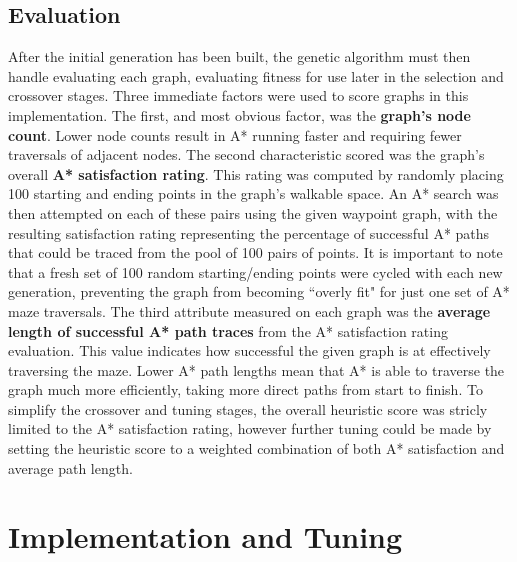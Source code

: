 	\subsection{Evaluation}
	After the initial generation has been built, the genetic algorithm must then handle evaluating each graph, evaluating fitness for use later in the selection and crossover stages. Three immediate factors were used to score graphs in this implementation. The first, and most obvious factor, was the \textbf{graph's node count}. Lower node counts result in A* running faster and requiring fewer traversals of adjacent nodes. The second characteristic scored was the graph's overall \textbf{A* satisfaction rating}. This rating was computed by randomly placing 100 starting and ending points in the graph's walkable space. An A* search was then attempted on each of these pairs using the given waypoint graph, with the resulting satisfaction rating representing the percentage of successful A* paths that could be traced from the pool of 100 pairs of points. It is important to note that a fresh set of 100 random starting/ending points were cycled with each new generation, preventing the graph from becoming ``overly fit" for just one set of A* maze traversals. The third attribute measured on each graph was the \textbf{average length of successful A* path traces} from the A* satisfaction rating evaluation. This value indicates how successful the given graph is at effectively traversing the maze. Lower A* path lengths mean that A* is able to traverse the graph much more efficiently, taking more direct paths from start to finish. To simplify the crossover and tuning stages, the overall heuristic score was stricly limited to the A* satisfaction rating, however further tuning could be made by setting the heuristic score to a weighted combination of both A* satisfaction and average path length.

\section{Implementation and Tuning}